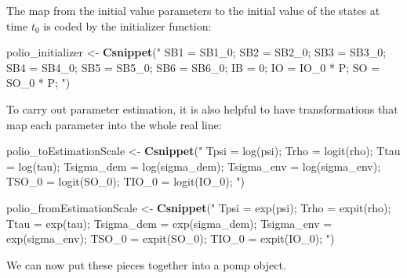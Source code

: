 \documentclass[]{article}
\newenvironment{Shaded}{\begin{snugshade}}{\end{snugshade}}
\newcommand{\KeywordTok}[1]{\textcolor[rgb]{0.13,0.29,0.53}{\textbf{#1}}}
\newcommand{\StringTok}[1]{\textcolor[rgb]{0.31,0.60,0.02}{#1}}
\newcommand{\NormalTok}[1]{#1}
\begin{document}
The map from the initial value parameters to the initial value of the
states at time \(t_0\) is coded by the initializer function:

\begin{Shaded}
\begin{Highlighting}[]
\NormalTok{polio_initializer <-}\StringTok{ }\KeywordTok{Csnippet}\NormalTok{(}\StringTok{"}
\StringTok{  SB1 = SB1_0;}
\StringTok{  SB2 = SB2_0;}
\StringTok{  SB3 = SB3_0;}
\StringTok{  SB4 = SB4_0;}
\StringTok{  SB5 = SB5_0;}
\StringTok{  SB6 = SB6_0;}
\StringTok{  IB = 0;}
\StringTok{  IO = IO_0 * P;}
\StringTok{  SO = SO_0 * P;}
\StringTok{"}\NormalTok{)}
\end{Highlighting}
\end{Shaded}

To carry out parameter estimation, it is also helpful to have
transformations that map each parameter into the whole real line:

\begin{Shaded}
\begin{Highlighting}[]
\NormalTok{polio_toEstimationScale <-}\StringTok{ }\KeywordTok{Csnippet}\NormalTok{(}\StringTok{"}
\StringTok{ Tpsi = log(psi);}
\StringTok{ Trho = logit(rho);}
\StringTok{ Ttau = log(tau);}
\StringTok{ Tsigma_dem = log(sigma_dem);}
\StringTok{ Tsigma_env = log(sigma_env);}
\StringTok{ TSO_0 =  logit(SO_0);}
\StringTok{ TIO_0 = logit(IO_0);}
\StringTok{"}\NormalTok{)}

\NormalTok{polio_fromEstimationScale <-}\StringTok{ }\KeywordTok{Csnippet}\NormalTok{(}\StringTok{"}
\StringTok{ Tpsi = exp(psi);}
\StringTok{ Trho = expit(rho);}
\StringTok{ Ttau = exp(tau);}
\StringTok{ Tsigma_dem = exp(sigma_dem);}
\StringTok{ Tsigma_env = exp(sigma_env);}
\StringTok{ TSO_0 =  expit(SO_0);}
\StringTok{ TIO_0 = expit(IO_0);}
\StringTok{"}\NormalTok{)}
\end{Highlighting}
\end{Shaded}

We can now put these pieces together into a pomp object.
\end{document}
